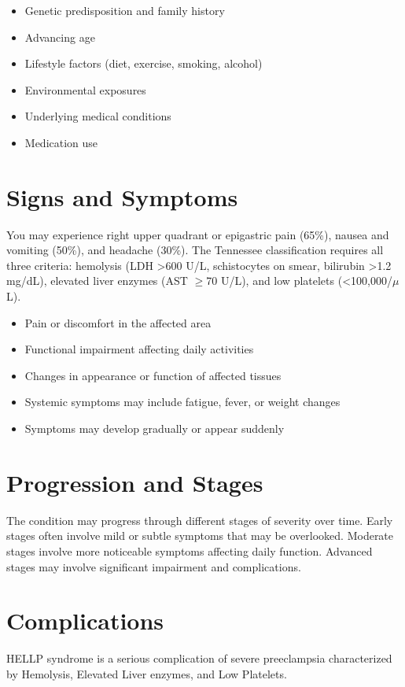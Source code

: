 \begin{itemize}[noitemsep]
  \item Genetic predisposition and family history
  \item Advancing age
  \item Lifestyle factors (diet, exercise, smoking, alcohol)
  \item Environmental exposures
  \item Underlying medical conditions
  \item Medication use
\end{itemize}
\section{Signs and Symptoms}
You may experience right upper quadrant or epigastric pain (65\%), nausea and vomiting (50\%), and headache (30\%). The Tennessee classification requires all three criteria: hemolysis (LDH >600 U/L, schistocytes on smear, bilirubin >1.2 mg/dL), elevated liver enzymes (AST $\ge$70 U/L), and low platelets (<100,000/$\mu$L).

\begin{itemize}[noitemsep]
  \item Pain or discomfort in the affected area
  \item Functional impairment affecting daily activities
  \item Changes in appearance or function of affected tissues
  \item Systemic symptoms may include fatigue, fever, or weight changes
  \item Symptoms may develop gradually or appear suddenly
\end{itemize}
\section{Progression and Stages}
The condition may progress through different stages of severity over time. Early stages often involve mild or subtle symptoms that may be overlooked. Moderate stages involve more noticeable symptoms affecting daily function. Advanced stages may involve significant impairment and complications.
\section{Complications}
HELLP syndrome is a serious complication of severe preeclampsia characterized by Hemolysis, Elevated Liver enzymes, and Low Platelets.

